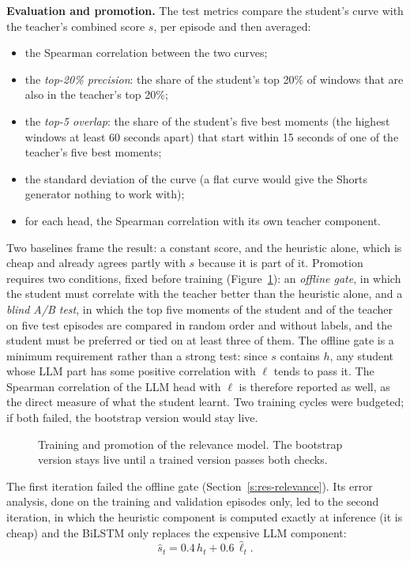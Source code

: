 \textbf{Evaluation and promotion.} The test metrics compare the student's curve with the teacher's combined score $s$, per episode and then averaged:
\begin{itemize}
\item the Spearman correlation \cite{spearman1904} between the two curves;
\item the \textit{top-20\% precision}: the share of the student's top 20\% of windows that are also in the teacher's top 20\%;
\item the \textit{top-5 overlap}: the share of the student's five best moments (the highest windows at least 60 seconds apart) that start within 15 seconds of one of the teacher's five best moments;
\item the standard deviation of the curve (a flat curve would give the Shorts generator nothing to work with);
\item for each head, the Spearman correlation with its own teacher component.
\end{itemize}
Two baselines frame the result: a constant score, and the heuristic alone, which is cheap and already agrees partly with $s$ because it is part of it. Promotion requires two conditions, fixed before training (Figure~\ref{fig:relevance-train}): an \textit{offline gate}, in which the student must correlate with the teacher better than the heuristic alone, and a \textit{blind A/B test}, in which the top five moments of the student and of the teacher on five test episodes are compared in random order and without labels, and the student must be preferred or tied on at least three of them. The offline gate is a minimum requirement rather than a strong test: since $s$ contains $h$, any student whose LLM part has some positive correlation with $\ell$ tends to pass it. The Spearman correlation of the LLM head with $\ell$ is therefore reported as well, as the direct measure of what the student learnt. Two training cycles were budgeted; if both failed, the bootstrap version would stay live.

\begin{figure}[H]
\centering
{}
\caption{Training and promotion of the relevance model. The bootstrap version stays live until a trained version passes both checks.}
\label{fig:relevance-train}
\end{figure}

The first iteration failed the offline gate (Section~\ref{s:res-relevance}). Its error analysis, done on the training and validation episodes only, led to the second iteration, in which the heuristic component is computed exactly at inference (it is cheap) and the BiLSTM only replaces the expensive LLM component:
\begin{equation}
\hat s_t = 0.4\,h_t + 0.6\,\hat\ell_t .
\label{eq:relevance-i2}
\end{equation}

